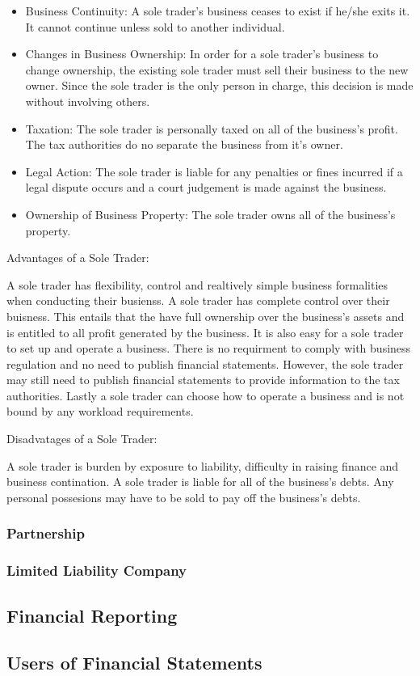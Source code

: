 \begin{itemize}
    \item Business Continuity: A sole trader's business ceases to exist if he/she exits it. It cannot continue unless sold to another individual.  
    \item Changes in Business Ownership: In order for a sole trader's business to change ownership, the existing sole trader must sell their business to the new owner. Since the sole trader is the only person in charge, this decision is made without involving others. 
    \item Taxation: The sole trader is personally taxed on all of the business's profit. The tax authorities do no separate the business from it's owner.  
    \item Legal Action: The sole trader is liable for any penalties or fines incurred if a legal dispute occurs and a court judgement is made against the business.   
    \item Ownership of Business Property: The sole trader owns all of the business's property. 
\end{itemize}

Advantages of a Sole Trader: 

A sole trader has flexibility, control and realtively simple business formalities when conducting their busienss. A sole trader has complete control over their buisness. This entails that the have full ownership over the business's assets and 
is entitled to all profit generated by the business. It is also easy for a sole trader to set up and operate a business. There is no requirment to comply with business regulation and no need to publish financial statements. However, the sole trader may still need 
to publish financial statements to provide information to the tax authorities. Lastly a sole trader can choose how to operate a business and is not bound by any workload requirements. 

Disadvatages of a Sole Trader: 

A sole trader is burden by exposure to liability, difficulty in raising finance and business contination. A sole trader is liable for all of the business's debts. Any personal possesions may have to be sold to pay off the business's debts. 
\subsubsection{Partnership}

\subsubsection{Limited Liability Company}

\subsection{Financial Reporting}

\subsection{Users of Financial Statements}
